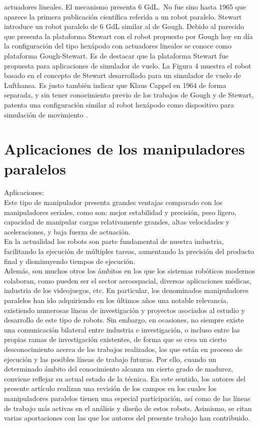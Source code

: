 \documentclass[letter,openright,12pt,spanish]{report}
\begin{document}
actuadores lineales. El mecanismo presenta 6 GdL.\
No fue sino hasta 1965 que aparece la primera publicación científica referida a un robot paralelo.
Stewart introduce un robot paralelo de 6 GdL similar al de Gough. Debido al parecido que presenta
la plataforma Stewart con el robot propuesto por Gough hoy en día la configuración del tipo hexápodo
con actuadores lineales se conoce como plataforma Gough-Stewart. Es de destacar que la plataforma
Stewart fue propuesta para aplicaciones de simulador de vuelo. La Figura 4 muestra el robot basado en
el concepto de Stewart desarrollado para un simulador de vuelo de Lufthansa. Es justo también indicar
que Klaus Cappel en 1964 de forma separada, y sin tener conocimiento previo de los trabajos de Gough
y de Stewart, patenta una configuración similar al robot hexápodo como dispositivo para simulación de
movimiento .\



\section{Aplicaciones de los manipuladores paralelos} 
Aplicaciones:\\
Este tipo de manipulador presenta grandes ventajas comparado con los manipuladores seriales, como son: mejor estabilidad y precisión, peso ligero, capacidad de manipular cargas relativamente grandes, altas velocidades y aceleraciones, y baja fuerza de actuación.\\

En la actualidad los robots son parte fundamental de nuestra industria, facilitando la ejecución de múltiples tareas, aumentando la precisión del producto final y disminuyendo tiempos de ejecución.\\ Además, son muchos otros los ámbitos en los que los sistemas robóticos modernos colaboran, como pueden ser el sector aeroespacial, diversas aplicaciones médicas, industria de los videojuegos, etc. En particular, los denominados manipuladores paralelos han ido adquiriendo en los últimos años una notable relevancia, existiendo numerosas líneas de investigación y proyectos asociados al estudio y desarrollo de este tipo de robots. Sin embargo, en ocasiones, no siempre existe una comunicación bilateral entre industria e investigación, o incluso entre las propias ramas de investigación existentes, de forma que se crea un cierto desconocimiento acerca de los trabajos realizados, los que están en proceso de ejecución y las posibles líneas de trabajo futuras. Por ello, cuando un determinado ámbito del conocimiento alcanza un cierto grado de madurez, conviene reflejar su actual estado de la técnica. En este sentido, los autores del presente artículo realizan una revisión de los campos en los cuales los manipuladores paralelos tienen una especial participación, así como de las líneas de trabajo más activas en el análisis y diseño de estos robots. Asimismo, se citan varias aportaciones con las que los autores del presente trabajo han contribuido.\\
\end{document}
